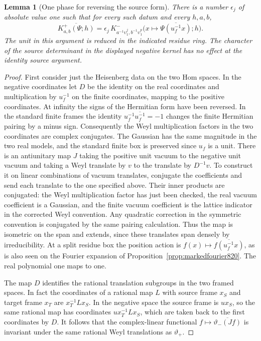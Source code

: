 \documentclass[a4paper,11pt]{article}
\newtheorem{lemma}[proposition]{Lemma}
\theoremstyle{definition}
\theoremstyle{remark}
\numberwithin{equation}{section}
\begin{document}
\begin{lemma}[One phase for reversing the source form]
\leavevmode\label{lem:signkernel823}
There is a number \(\epsilon_j\) of absolute value one such
that for every such datum and every \(h,a,b\),
\[
 \overline{K^+_{a,b}(\Psi;h)}
       =\epsilon_j\,K^-_{a^{-1}\upsilon_1^j,
                                 b^{-1}\upsilon_1^p}
          \bigl(x\mapsto\overline{\Psi(u_f^{-1}x)};h\bigr).
\]
The unit in this argument is reduced in the indicated residue
ring. The character of the source determinant in the displayed
negative kernel has no effect at the identity source argument.
\end{lemma}
\begin{proof}
First consider just the Heisenberg data on the two Hom spaces.
In the negative coordinates let \(D\) be the identity on the
real coordinates and multiplication by \(u_f^{-1}\) on the
finite coordinates, mapping to the positive coordinates.
At infinity the signs of the Hermitian form have been reversed.
In the standard finite frames the identity
\(u_f^{-1}\overline{u_f^{-1}}=-1\) changes the finite Hermitian
pairing by a minus sign. Consequently the Weyl multiplication
factors in the two coordinates are complex conjugates. The
Gaussian has the same magnitude in the two real models, and
the standard finite box is preserved since \(u_f\) is a unit.
There is an antiunitary map \(J\) taking the positive unit
vacuum to the negative unit vacuum and taking a Weyl translate
by \(v\) to the translate by \(D^{-1}v\). To construct it on
linear combinations of vacuum translates, conjugate the
coefficients and send each translate to the one specified above.
Their inner products are conjugated: the Weyl multiplication
factor has just been checked, the real vacuum coefficient is a
Gaussian, and the finite vacuum coefficient is the lattice
indicator in the corrected Weyl convention. Any quadratic
correction in the symmetric convention is conjugated by the
same pairing calculation. Thus the map is isometric on the
span and extends, since these translates span densely by
irreducibility. At a split residue box the position action is
\(f(x)\mapsto\overline{f(u_f^{-1}x)}\), as is also seen on the
Fourier expansion of Proposition~\ref{prop:markedfourier820}.
The real polynomial one maps to one.

The map \(D\) identifies the rational translation subgroups in
the two framed spaces. In fact the coordinates of a rational
map \(L\) with source frame \(x_S\) and target frame \(x_T\)
are \(x_T^{-1}L x_S\). In the negative space the source frame
is \(u x_S\), so the same rational map has coordinates
\(u x_T^{-1}Lx_S\), which are taken back to the first coordinates
by \(D\). It follows that the complex-linear functional
\(f\mapsto\overline{\vartheta_-(Jf)}\) is invariant under
the same rational Weyl translations as \(\vartheta_+\).


\end{proof}
\end{document}

